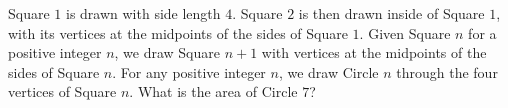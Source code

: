 Square $1$ is drawn with side length $4$. Square $2$ is then drawn inside of Square $1$, with its vertices at the midpoints of the sides of Square $1$. Given Square $n$ for a positive integer $n$, we draw Square $n+1$ with vertices at the midpoints of the sides of Square $n$. For any positive integer $n$, we draw Circle $n$ through the four vertices of Square $n$. What is the area of Circle $7$?